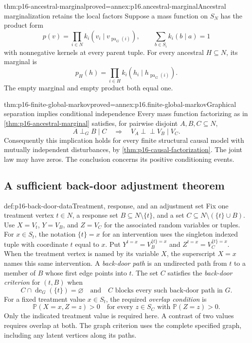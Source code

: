 \begin{hblemma}{thm:p16-ancestral-marginal}{proved=annex:p16.ancestral-marginal}{Ancestral marginalization retains the local factors}
Suppose a mass function on \(S_N\) has the product form
\[
 p(v)=\prod_{i\in N}k_i(v_i\mid v_{\operatorname{pa}_G(i)}),
 \qquad \sum_{b\in S_i}k_i(b\mid a)=1
\]
with nonnegative kernels at every parent tuple. For every ancestral
\(H\subseteq N\), its marginal is
\[
 p_H(h)=\prod_{i\in H}k_i(h_i\mid h_{\operatorname{pa}_G(i)}).
\]
The empty marginal and empty product both equal one.
\end{hblemma}

\begin{hbtheorem}{thm:p16-finite-global-markov}{proved=annex:p16.finite-global-markov}{Graphical separation implies conditional independence}
Every mass function factorizing as in
\cref{thm:p16-ancestral-marginal} satisfies, for pairwise disjoint
\(A,B,C\subseteq N\),
\[
 A\mathrel{\perp_G}B\mid C
 \quad\Longrightarrow\quad
 V_A\mathrel{\perp\!\!\!\perp}V_B\mid V_C.
\]
Consequently this implication holds for every finite structural causal
model with mutually independent disturbances, by
\cref{thm:p16-causal-factorization}. The joint law may have zeros.
The conclusion concerns its positive conditioning events.
\end{hbtheorem}

\subsection{A sufficient back-door adjustment theorem}

\begin{hbdefinition}{def:p16-back-door-data}{Treatment, response, and an adjustment set}
Fix one treatment vertex \(t\in N\), a response set
\(B\subseteq N\setminus\{t\}\), and a set
\(C\subseteq N\setminus(\{t\}\cup B)\). Use
\(X=V_t\), \(Y=V_B\), and \(Z=V_C\) for the associated random
variables or tuples. For \(x\in S_t\), the notation \(\{t\}=x\)
for an intervention uses the singleton indexed tuple with coordinate
\(t\) equal to \(x\). Put
\(Y^{t=x}=V_B^{\{t\}=x}\) and
\(Z^{t=x}=V_C^{\{t\}=x}\). When the treatment vertex is named by
its variable \(X\), the superscript \(X=x\) names this same
intervention. A \emph{back-door path} is an undirected path
from \(t\) to a member of \(B\) whose first edge points into
\(t\). The set \(C\) satisfies the \emph{back-door criterion}
for \((t,B)\) when
\[
 C\cap\operatorname{de}_G(\{t\})=\varnothing
 \quad\text{and}\quad
 C\text{ blocks every such back-door path in }G.
\]
For a fixed treatment value \(x\in S_t\), the required
\emph{overlap condition} is
\[
 \mathbb P(X=x,Z=z)>0
 \quad\text{for every }z\in S_C
                   \text{ with }\mathbb P(Z=z)>0.
\]
Only the indicated treatment value is required here. A contrast of two
values requires overlap at both. The graph criterion uses the complete
specified graph, including any latent vertices along its paths.
\end{hbdefinition}


